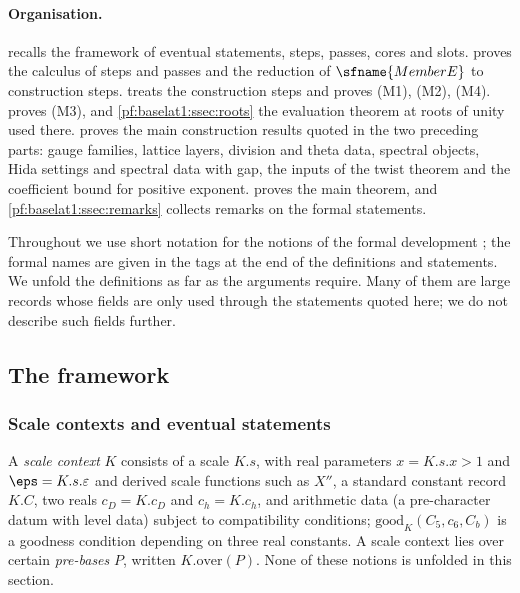 \paragraph{Organisation.}  recalls the framework of eventual statements,
steps, passes, cores and slots.  proves the calculus of steps and passes
and the reduction of $\sfname{MemberE}$ to construction steps.  treats the
construction steps and proves (M1), (M2), (M4).  proves (M3), and
\cref{pf:baselat1:ssec:roots} the evaluation theorem at roots of unity used there.
 proves the main construction results quoted in the two preceding parts: gauge
families, lattice layers, division and theta data, spectral objects, Hida settings and spectral data with gap, the
inputs of the twist theorem and the coefficient bound for positive exponent.  proves the
main theorem, and \cref{pf:baselat1:ssec:remarks} collects remarks
on the formal statements.

Throughout we use short notation for the notions of the formal development \cite{LeanSource2026}; the formal
names are given in the tags at the end of the definitions and statements. We unfold the definitions as far as
the arguments require. Many of them are large records whose fields are only used through the statements
quoted here; we do not describe such fields further.

\subsection{The framework}\label{pf:baselat1:ssec:framework}

\subsubsection{Scale contexts and eventual statements}

A \emph{scale context} $K$ consists of a scale $K.s$, with real parameters $x=K.s.x>1$
and $\eps=K.s.\varepsilon$ and derived scale functions such as $X''$, a standard constant record $K.C$, two
reals $c_D=K.c_D$ and $c_h=K.c_h$, and arithmetic data (a pre-character datum with level data) subject to
compatibility conditions; $\mathrm{good}_K(C_5,c_6,C_b)$ is a goodness condition depending on three real
constants. A scale context lies over certain \emph{pre-bases} $P$, written $K.\mathrm{over}(P)$. None of
these notions is unfolded in this section.


